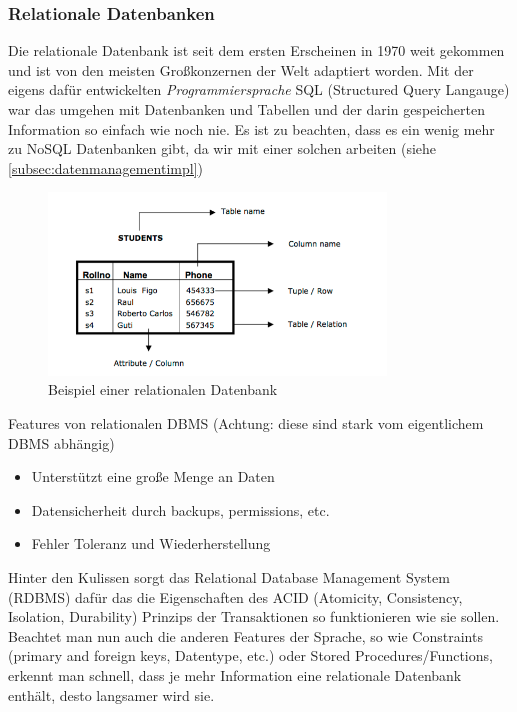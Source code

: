\subsubsection{Relationale Datenbanken}
\label{subsec:relationaleDB}

Die relationale Datenbank ist seit dem ersten Erscheinen in 1970 weit gekommen und ist von den meisten Großkonzernen der Welt adaptiert worden. Mit der eigens dafür entwickelten \textit{Programmiersprache} SQL (Structured Query Langauge) war das umgehen mit Datenbanken und Tabellen und der darin gespeicherten Information so einfach wie noch nie. Es ist zu beachten, dass es ein wenig mehr zu NoSQL Datenbanken gibt, da wir mit einer solchen arbeiten (siehe \ref{subsec:datenmanagementimpl})

\begin{figure}[!htb]\centering
	\includegraphics[width=0.8\textwidth]{images/relationaleTabelle}
	\caption{Beispiel einer relationalen Datenbank}
\end{figure}

Features von relationalen DBMS (Achtung: diese sind stark vom eigentlichem DBMS abhängig)
\begin{itemize}
\item Unterstützt eine große Menge an Daten
\item Datensicherheit durch backups, permissions, etc.
\item Fehler Toleranz und Wiederherstellung
\end{itemize}

Hinter den Kulissen sorgt das Relational Database Management System (RDBMS) dafür das die Eigenschaften des ACID (Atomicity, Consistency, Isolation, Durability) Prinzips der Transaktionen so funktionieren wie sie sollen. Beachtet man nun auch die anderen Features der Sprache, so wie Constraints (primary and foreign keys, Datentype, etc.) oder Stored Procedures/Functions, erkennt man schnell, dass je mehr Information eine relationale Datenbank enthält, desto langsamer wird sie.

